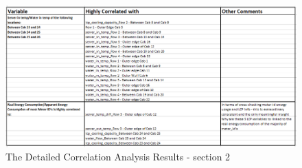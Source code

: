 \documentclass[12pt]{scrartcl}
\begin{document}
\begin{figure}[h]
  \caption{The Detailed Correlation Analysis Results - section 2}
  \label{fig:Correlation_Analysis_2}
  \centering
    \includegraphics[scale=0.50]{Correlation_Analysis_2}
\end{figure} 
\end{document}
